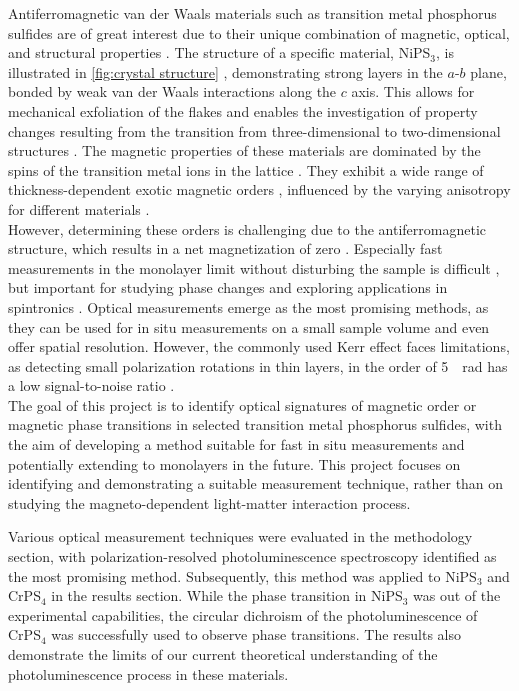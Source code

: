 \documentclass[
	twoside,
	parskip=half,
	a4paper,
]{scrbook}
\begin{document}
Antiferromagnetic van der Waals materials such as transition metal phosphorus sulfides are of great interest due to their unique combination of magnetic, optical, and structural properties \cite{MPX_review}. 
The structure of a specific material, NiPS$_3$, is illustrated in \autoref{fig:crystal structure} \cite{NiPS3_coherent}, demonstrating strong layers in the $a$-$b$ plane, bonded by weak van der Waals interactions along the $c$ axis.
This allows for mechanical exfoliation of the flakes and enables the investigation of property changes resulting from the transition from three-dimensional to two-dimensional structures \cite{MPX_review}.
The magnetic properties of these materials are dominated by the spins of the transition metal ions in the lattice \cite{MPS_magnetism}.
They exhibit a wide range of thickness-dependent exotic magnetic orders \cite{AFM_review}, influenced by the varying anisotropy for different materials \cite{MPS_magnetism, CrPS4_magnetic}.\\
However, determining these orders is challenging due to the antiferromagnetic structure, which results in a net magnetization of zero \cite{MPX_review,MPS_magnetism,afm}.
Especially fast measurements in the monolayer limit without disturbing the sample is difficult \cite{AFM_review, CrPS4_magnetic}, but important for studying phase changes and exploring applications in spintronics \cite{AFM_review}.
Optical measurements emerge as the most promising methods, as they can be used for in situ measurements on a small sample volume and even offer spatial resolution. 
However, the commonly used Kerr effect faces limitations, as detecting small polarization rotations in thin layers, in the order of \SI{5}{\mu rad} has a low signal-to-noise ratio \cite{AFM_review}. \\
The goal of this project is to identify optical signatures of magnetic order or magnetic phase transitions in selected transition metal phosphorus sulfides, with the aim of developing a method suitable for fast in situ measurements and potentially extending to monolayers in the future.
This project focuses on identifying and demonstrating a suitable measurement technique, rather than on studying the magneto-dependent light-matter interaction process.

Various optical measurement techniques were evaluated in the methodology section, with polarization-resolved photoluminescence spectroscopy identified as the most promising method.
Subsequently, this method was applied to NiPS$_3$ and CrPS$_4$ in the results section.
While the phase transition in NiPS$_3$ was out of the experimental capabilities, the circular dichroism of the photoluminescence of CrPS$_4$ was successfully used to observe phase transitions.
The results also demonstrate the limits of our current theoretical understanding of the photoluminescence process in these materials. 
\end{document}
